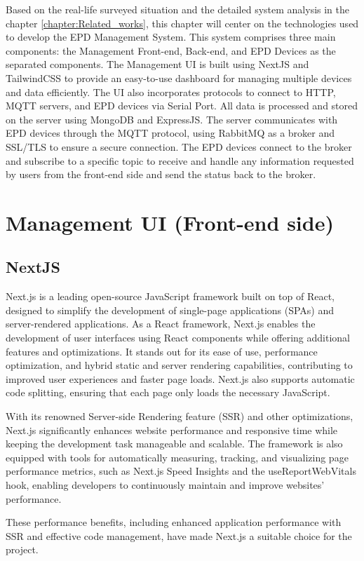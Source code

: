 \documentclass[../Main.tex]{subfiles}
\begin{document}
Based on the real-life surveyed situation and the detailed system analysis in the chapter \ref{chapter:Related_works}, this chapter will center on the technologies used to develop the EPD  Management System. This system comprises three main components: the Management Front-end, Back-end, and EPD Devices as the separated components. The Management UI is built using NextJS and TailwindCSS to provide an easy-to-use dashboard for managing multiple devices and data efficiently. The UI also incorporates protocols to connect to HTTP, MQTT servers, and EPD devices via Serial Port. All data is processed and stored on the server using MongoDB and ExpressJS. The server communicates with EPD devices through the MQTT protocol, using RabbitMQ as a broker and SSL/TLS to ensure a secure connection. The EPD devices connect to the broker and subscribe to a specific topic to receive and handle any information requested by users from the front-end side and send the status back to the broker.

\section{Management UI (Front-end side)}
\subsection{NextJS}
Next.js is a leading open-source JavaScript framework built on top of React, designed to simplify the development of single-page applications (SPAs) and server-rendered applications. As a React framework, Next.js enables the development of user interfaces using React components while offering additional features and optimizations. It stands out for its ease of use, performance optimization, and hybrid static and server rendering capabilities, contributing to improved user experiences and faster page loads. Next.js also supports automatic code splitting, ensuring that each page only loads the necessary JavaScript.

With its renowned Server-side Rendering feature (SSR) and other optimizations, Next.js significantly enhances website performance and responsive time while keeping the development task manageable and scalable. The framework is also equipped with tools for automatically measuring, tracking, and visualizing page performance metrics, such as Next.js Speed Insights and the useReportWebVitals hook, enabling developers to continuously maintain and improve websites' performance. 

These performance benefits, including enhanced application performance with SSR and effective code management, have made Next.js a suitable choice for the project.
\end{document}
